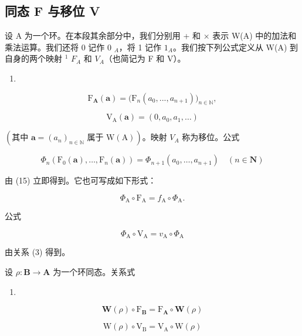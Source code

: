 \subsection{同态 F 与移位 V}

设 A 为一个环。在本段其余部分中，我们分别用 + 和 × 表示 W(A) 中的加法和乘法运算。我们还将 0 记作 0 \(_{A}\)，将 1 记作 \(1_{A}\)。我们按下列公式定义从 W(A) 到自身的两个映射 \(^{1}\) \(F_{A}\) 和 \(V_{A}\)（也简记为 F 和 V）。

\begin{enumerate}
\def\labelenumi{(\arabic{enumi})}
\setcounter{enumi}{22}
\tightlist
\item
\end{enumerate}

\[
\mathrm{F} _ {\mathbf {A}} (\boldsymbol {a}) = \big (\mathrm{F} _ {n} (a _ {0},..., a _ {n + 1}) \big) _ {n \in \mathbb {N}},\tag{24}
\]

\[
\mathrm{V} _ {\mathrm{A}} (\boldsymbol {a}) = (0, a _ {0}, a _ {1}, \dots)
\]

\((\text{其中 } \boldsymbol{a} = (a_n)_{n \in \mathbb{N}} \text{ 属于 } \mathrm{W(A)})\)。映射 \(V_A\) 称为移位。公式

\[
\Phi_ {n} \left(\mathrm{F} _ {0} (\boldsymbol {a}), \dots , \mathrm{F} _ {n} (\boldsymbol {a})\right) = \Phi_ {n + 1} \left(a _ {0}, \dots , a _ {n + 1}\right) \quad (n \in \mathbf {N})\tag{25}
\]

由 (15) 立即得到。它也可写成如下形式：

\[
\Phi_ {\mathrm{A}} \circ \mathrm{F} _ {\mathrm{A}} = f _ {\mathrm{A}} \circ \Phi_ {\mathrm{A}}.\tag{26}
\]

公式

\[
\Phi_ {\mathrm{A}} \circ \mathrm{V} _ {\mathrm{A}} = v _ {\mathrm{A}} \circ \Phi_ {\mathrm{A}}\tag{27}
\]

由关系 (3) 得到。

设 \(\rho : \mathbf{B} \to \mathbf{A}\) 为一个环同态。关系式

\begin{enumerate}
\def\labelenumi{(\arabic{enumi})}
\setcounter{enumi}{27}
\tightlist
\item
\end{enumerate}

\[
\mathbf {W} (\rho) \circ \mathrm{F} _ {\mathbf {B}} = \mathrm{F} _ {\mathbf {A}} \circ \mathbf {W} (\rho)\tag{29}
\]

\[
\mathrm{W} (\rho) \circ \mathrm{V} _ {\mathrm{B}} = \mathrm{V} _ {\mathrm{A}} \circ \mathrm{W} (\rho)
\]

